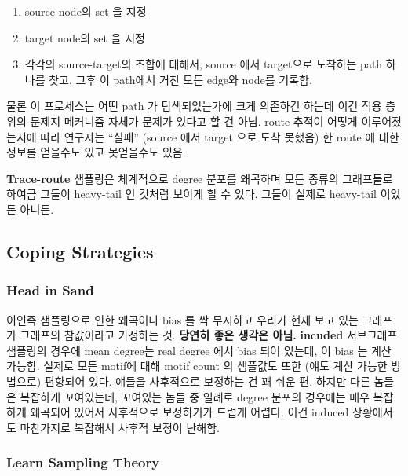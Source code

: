 \documentclass[
]{book}
\providecommand{\tightlist}{%
  \setlength{\itemsep}{0pt}\setlength{\parskip}{0pt}}
\begin{document}
{{{\begin{enumerate}
\def\labelenumi{\arabic{enumi}.}
\tightlist
\item
  source node의 set 을 지정
\item
  target node의 set 을 지정
\item
  각각의 source-target의 조합에 대해서, source 에서 target으로 도착하는 path 하나를 찾고, 그후 이 path에서 거친 모든 edge와 node를 기록함.
\end{enumerate}

물론 이 프로세스는 어떤 path 가 탐색되었는가에 크게 의존하긴 하는데 이건 적용 층위의 문제지 메커니즘 자체가 문제가 있다고 할 건 아님. route 추적이 어떻게 이루어졌는지에 따라 연구자는 ``실패'' (source 에서 target 으로 도착 못했음) 한 route 에 대한 정보를 얻을수도 있고 못얻을수도 있음.

\textbf{Trace-route} 샘플링은 체계적으로 degree 분포를 왜곡하며 모든 종류의 그래프들로 하여금 그들이 heavy-tail 인 것처럼 보이게 할 수 있다. 그들이 실제로 heavy-tail 이었든 아니든.

\hypertarget{coping-strategies}{%
\subsection{Coping Strategies}\label{coping-strategies}}

\hypertarget{head-in-sand}{%
\subsubsection{Head in Sand}\label{head-in-sand}}

이인즉 샘플링으로 인한 왜곡이나 bias 를 싹 무시하고 우리가 현재 보고 있는 그래프가 그래프의 참값이라고 가정하는 것. \textbf{당연히 좋은 생각은 아님.} \textbf{incuded} 서브그래프 샘플링의 경우에 mean degree는 real degree 에서 bias 되어 있는데, 이 bias 는 계산 가능함. 실제로 모든 motif에 대해 motif count 의 샘플값도 또한 (얘도 계산 가능한 방법으로) 편향되어 있다. 얘들을 사후적으로 보정하는 건 꽤 쉬운 편. 하지만 다른 놈들은 복잡하게 꼬여있는데, 꼬여있는 놈들 중 일례로 degree 분포의 경우에는 매우 복잡하게 왜곡되어 있어서 사후적으로 보정하기가 드럽게 어렵다. 이건 induced 상황에서도 마찬가지로 복잡해서 사후적 보정이 난해함.

\hypertarget{learn-sampling-theory}{%
\subsubsection{Learn Sampling Theory}\label{learn-sampling-theory}}

}}}
\end{document}
